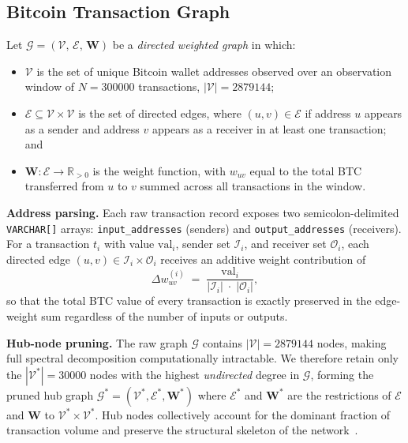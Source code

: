 \subsection{Bitcoin Transaction Graph}
\label{subsec:graph}

\begin{definition}
\label{def:graph}
Let $\mathcal{G} = (\mathcal{V},\,\mathcal{E},\,\mathbf{W})$ be a
\emph{directed weighted graph} in which:
\begin{itemize}
  \item $\mathcal{V}$ is the set of unique Bitcoin wallet addresses observed
        over an observation window of $N = \num{300000}$ transactions,
        $|\mathcal{V}| = \num{2879144}$;
  \item $\mathcal{E} \subseteq \mathcal{V}\times\mathcal{V}$ is the set of
        directed edges, where $(u,v)\in\mathcal{E}$ if address $u$ appears as
        a sender and address $v$ appears as a receiver in at least one
        transaction; and
  \item $\mathbf{W}:\mathcal{E}\to\mathbb{R}_{>0}$ is the weight function,
        with $w_{uv}$ equal to the total BTC transferred from $u$ to $v$
        summed across all transactions in the window.
\end{itemize}
\end{definition}

\noindent\textbf{Address parsing.}
Each raw transaction record exposes two semicolon-delimited
\texttt{VARCHAR[]} arrays: \texttt{input\_addresses} (senders) and
\texttt{output\_addresses} (receivers).
For a transaction $t_i$ with value $\mathrm{val}_i$, sender set
$\mathcal{I}_i$, and receiver set $\mathcal{O}_i$, each directed edge
$(u,v)\in\mathcal{I}_i\times\mathcal{O}_i$ receives an additive weight
contribution of
\begin{equation}
  \Delta w_{uv}^{(i)}
    \;=\;
    \frac{\mathrm{val}_i}{|\mathcal{I}_i|\;\cdot\;|\mathcal{O}_i|},
  \label{eq:edge_weight}
\end{equation}
so that the total BTC value of every transaction is exactly preserved in the
edge-weight sum regardless of the number of inputs or outputs.

\noindent\textbf{Hub-node pruning.}
The raw graph $\mathcal{G}$ contains $|\mathcal{V}| = \num{2879144}$ nodes,
making full spectral decomposition computationally intractable.
We therefore retain only the $|\mathcal{V}^{*}| = \num{30000}$ nodes with
the highest \emph{undirected} degree in $\mathcal{G}$, forming the pruned
hub graph $\mathcal{G}^{*} = (\mathcal{V}^{*}, \mathcal{E}^{*}, \mathbf{W}^{*})$
where $\mathcal{E}^{*}$ and $\mathbf{W}^{*}$ are the restrictions of
$\mathcal{E}$ and $\mathbf{W}$ to $\mathcal{V}^{*}\times\mathcal{V}^{*}$.
Hub nodes collectively account for the dominant fraction of transaction volume
and preserve the structural skeleton of the network~\cite{leskovec2007graph}.

